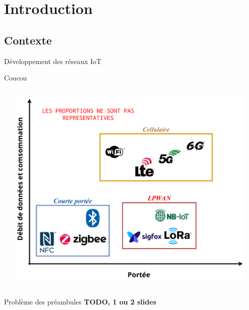 \documentclass[../main.tex]{subfiles}
\begin{document}
\section{Introduction}

\subsection{Contexte}

\begin{frame}{Développement des réseaux IoT}
  \begin{overlayarea}{\linewidth}{.2\textheight}
    Coucou
  \end{overlayarea}
  
  \begin{columns}
    \begin{column}{.3\linewidth}
      \hfill
    \end{column}
    \begin{column}{.6\linewidth} \centering
      \includegraphics[width=\linewidth]{figures/drawiopdf/lpwan_and_co}
    \end{column}
    \begin{column}{.1\linewidth}
      \hfill
    \end{column}
  \end{columns}
\end{frame}


\begin{frame}{Problème des préambules}
  \textbf{TODO, 1 ou 2 slides}
\end{frame}
\end{document}
